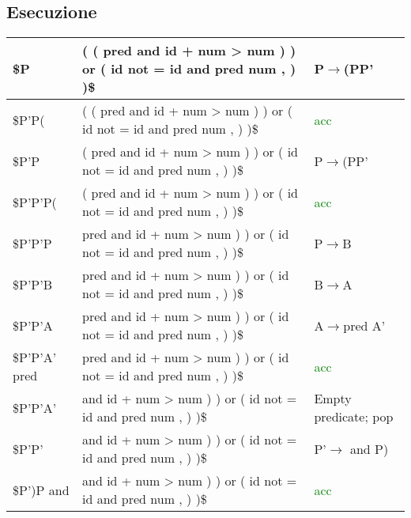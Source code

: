 \documentclass[11pt, a4paper]{article}
\begin{document}
\subsection{Esecuzione}

\begin{table}[!ht]
    \centering
    \begin{tabular}{|l|l|l|}
    \hline
        \$P & \makecell{( ( pred and id + num > num ) ) \\or ( id not = id and pred num , ) )\$} & P$\rightarrow$(PP' \\ \hline
        \$P'P( & \makecell{( ( pred and id + num > num ) ) \\or ( id not = id and pred num , ) )\$} & \textcolor{green}{acc} \\ \hline
        \$P'P & \makecell{( pred and id + num > num ) ) \\or ( id not = id and pred num , ) )\$} & P$\rightarrow$(PP' \\ \hline
        \$P'P'P( & \makecell{( pred and id + num > num ) ) \\or ( id not = id and pred num , ) )\$} & \textcolor{green}{acc} \\ \hline
        \$P'P'P & \makecell{pred and id + num > num ) ) \\or ( id not = id and pred num , ) )\$} & P$\rightarrow$B \\ \hline
        \$P'P'B & \makecell{pred and id + num > num ) ) \\or ( id not = id and pred num , ) )\$} & B$\rightarrow$A \\ \hline
        \$P'P'A & \makecell{pred and id + num > num ) ) \\or ( id not = id and pred num , ) )\$} & A$\rightarrow$pred A' \\ \hline
        \$P'P'A' pred & \makecell{pred and id + num > num ) ) \\or ( id not = id and pred num , ) )\$} & \textcolor{green}{acc} \\ \hline
        \$P'P'A' & \makecell{and id + num > num ) ) \\or ( id not = id and pred num , ) )\$} & Empty predicate; pop \\ \hline
        \$P'P' & \makecell{and id + num > num ) ) \\or ( id not = id and pred num , ) )\$} & P'$\rightarrow$ and P) \\ \hline
        \$P')P and & and id + num > num ) ) or ( id not = id and pred num , ) )\$} & \textcolor{green}{acc} \\ \hline

\end{tabular}
\end{table}
\end{document}
